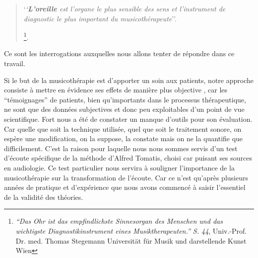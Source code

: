 \begin{quotation}
	`\textit{`\textbf{L'oreille }est l'organe le plus sensible des sens 
et l'instrument de diagnostic  le plus important du
musicothérapeute}''.

\autocite{seminar_zuerich}\footnote{ \textit{``Das Ohr ist das empfindlichste
  Sinnesorgan des Menschen und das wichtigste Diagnostikinstrument
  eines Musiktherapeuten.'' S. 44}, Univ.-Prof. Dr. med. Thomas Stegemann Universität für Musik und darstellende Kunst Wien}.
 \end{quotation}	
Ce sont les interrogations auxquelles nous allons tenter de
répondre dans ce travail.

Si le but de la musicothérapie est d'apporter un soin aux patients,
notre  approche consiste à mettre en évidence ses effets de manière
plus objective , car les ``témoignages'' de patients,  bien qu'importants dans le processus thérapeutique,
ne sont que des données subjectives et donc peu exploitables d'un
point de vue scientifique. Fort nous a été de
constater un manque d'outils pour son évaluation. Car quelle que soit la technique utilisée, quel que soit
le traitement sonore, on espère une modification, on la suppose, la constate
 mais
 on ne la quantifie que difficilement. C'est la raison pour laquelle
 nous nous sommes servis d'un test d'écoute
 spécifique de la méthode d'Alfred Tomatis, choisi car puisant ses
 sources en audiologie.
 Ce test particulier  nous servira à
 souligner l'importance de la musicothérapie 
 sur la transformation de l'écoute.
 Car ce n'est qu'après plusieurs
années de pratique et d'expérience que nous avons commencé à saisir
l'essentiel de la validité des théories.

 


 

  


